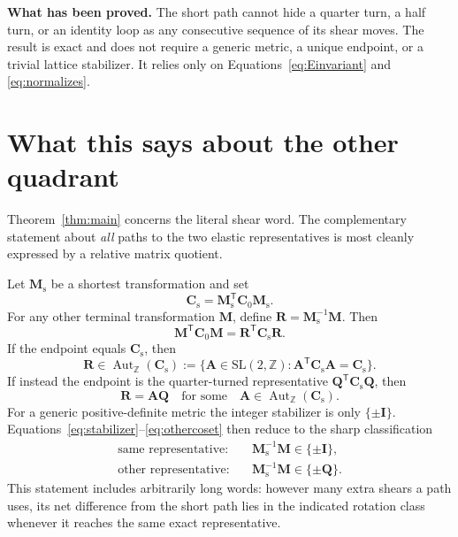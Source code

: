 \documentclass[11pt]{article}
\newcommand{\trans}{\mathsf{T}}
\newcommand{\SLZ}{\mathrm{SL}(2,\mathbb Z)}
\newcommand{\Aut}{\operatorname{Aut}_{\mathbb Z}}
\theoremstyle{definition}
\begin{document}
\noindent
\colorbox{softblue}{%
\parbox{\dimexpr\textwidth-2\fboxsep}{%
\textbf{What has been proved.}
The short path cannot hide a quarter turn, a half turn, or an identity loop
as any consecutive sequence of its shear moves.  The result is exact and
does not require a generic metric, a unique endpoint, or a trivial lattice
stabilizer.  It relies only on Equations~\eqref{eq:Einvariant} and
\eqref{eq:normalizes}.}}

\section{What this says about the other quadrant}

Theorem~\ref{thm:main} concerns the literal shear word.  The complementary
statement about \emph{all} paths to the two elastic representatives is most
cleanly expressed by a relative matrix quotient.

Let \(\mathbf M_{\mathrm s}\) be a shortest transformation and set
\begin{equation}
 \mathbf C_{\mathrm s}
 =\mathbf M_{\mathrm s}^\trans\mathbf C_0\mathbf M_{\mathrm s}.
\end{equation}
For any other terminal transformation \(\mathbf M\), define
\(\mathbf R=\mathbf M_{\mathrm s}^{-1}\mathbf M\).  Then
\begin{equation}
 \mathbf M^\trans\mathbf C_0\mathbf M
 =\mathbf R^\trans\mathbf C_{\mathrm s}\mathbf R.
 \label{eq:relativeendpoint}
\end{equation}
If the endpoint equals \(\mathbf C_{\mathrm s}\), then
\begin{equation}
 \mathbf R\in\Aut(\mathbf C_{\mathrm s})
 :=\{\mathbf A\in\SLZ:
 \mathbf A^\trans\mathbf C_{\mathrm s}\mathbf A
 =\mathbf C_{\mathrm s}\}.
 \label{eq:stabilizer}
\end{equation}
If instead the endpoint is the quarter-turned representative
\(\mathbf Q^\trans\mathbf C_{\mathrm s}\mathbf Q\), then
\begin{equation}
 \mathbf R=\mathbf A\mathbf Q
 \quad\text{for some}\quad
 \mathbf A\in\Aut(\mathbf C_{\mathrm s}).
 \label{eq:othercoset}
\end{equation}
For a generic positive-definite metric the integer stabilizer is only
\(\{\pm\mathbf I\}\).  Equations~\eqref{eq:stabilizer}--\eqref{eq:othercoset}
then reduce to the sharp classification
\begin{equation}
 \boxed{
 \begin{aligned}
 \text{same representative:}\quad
 &\mathbf M_{\mathrm s}^{-1}\mathbf M\in\{\pm\mathbf I\},\\
 \text{other representative:}\quad
 &\mathbf M_{\mathrm s}^{-1}\mathbf M\in\{\pm\mathbf Q\}.
 \end{aligned}}
 \label{eq:classification}
\end{equation}
This statement includes arbitrarily long words: however many extra shears a
path uses, its net difference from the short path lies in the indicated
rotation class whenever it reaches the same exact representative.
\end{document}
